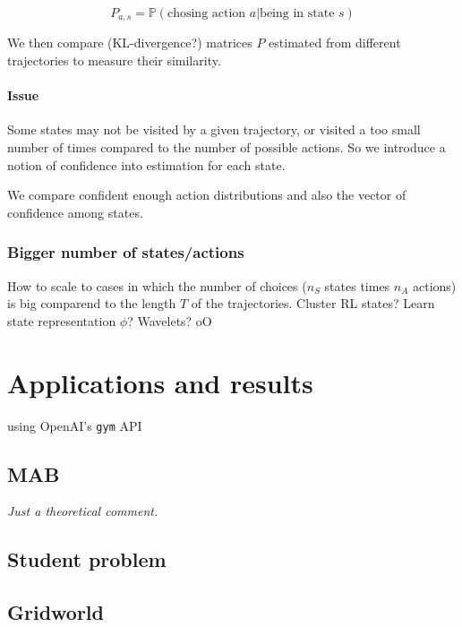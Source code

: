 \documentclass{article}
\begin{document}
\[
P_{a,s} = \mathbb P(\text{chosing action } a | \text{being in state } s)
\]

We then compare (KL-divergence?) matrices $P$ estimated from different trajectories to measure their similarity.

\paragraph{Issue} Some states may not be visited by a given trajectory, or visited a too small number of times compared to the number of possible actions. So we introduce a notion of confidence into estimation for each state.

We compare confident enough action distributions and also the vector of confidence among states.

\subsubsection{Bigger number of states/actions}

How to scale to cases in which the number of choices ($n_S$ states times $n_A$ actions) is big comparend to the length $T$ of the trajectories. Cluster RL states? Learn state representation $\phi$? Wavelets? oO


\section{Applications and results \label{sec:results}}

using OpenAI's \verb|gym| API

\subsection{MAB}

\emph{Just a theoretical comment.}

\subsection{Student problem}

\subsection{Gridworld}



\end{document}
